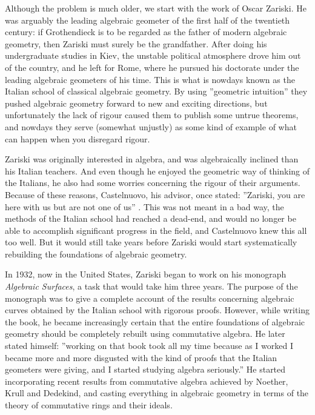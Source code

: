 \documentclass[12pt,a4paper,leqno]{article}
\theoremstyle{plain}
\theoremstyle{definition}
\theoremstyle{remark}
\begin{document}
Although the problem is much older, we start with the work of Oscar Zariski. He was arguably the leading algebraic geometer of the first half of the twentieth century: if Grothendieck is to be regarded as the father of modern algebraic geometry, then Zariski must surely be the grandfather. After doing his undergraduate studies in Kiev, the unstable political atmosphere drove him out of the country, and he left for Rome, where he pursued his doctorate under the leading algebraic geometers of his time. This is what is nowdays known as the Italian school of classical algebraic geometry. By using ''geometric intuition'' they pushed algebraic geometry forward to new and exciting directions, but unfortunately the lack of rigour caused them to publish some untrue theorems, and nowdays they serve (somewhat unjustly) as some kind of example of what can happen when you disregard rigour.

Zariski was originally interested in algebra, and was algebraically inclined than his Italian teachers. And even though he enjoyed the geometric way of thinking of the Italians, he also had some worries concerning the rigour of their arguments. Because of these reasons, Castelnuovo, his advisor, once stated: ''Zariski, you are here with us but are not one of us'' \cite{Par}. This was not meant in a bad way, the methods of the Italian school had reached a dead-end, and would no longer be able to accomplish significant progress in the field, and Castelnuovo knew this all too well. But it would still take years before Zariski would start systematically rebuilding the foundations of algebraic geometry.

In 1932, now in the United States, Zariski began to work on his monograph \emph{Algebraic Surfaces}, a task that would take him three years. The purpose of the monograph was to give a complete account of the results concerning algebraic curves obtained by the Italian school with rigorous proofs. However, while writing the book, he became increasingly certain that the entire foundations of algebraic geometry should be completely rebuilt using commutative algebra. He later stated himself: ''working on that book took all my time because as I worked I became more and more disgusted with the kind of proofs that the Italian geometers were giving, and I started studying algebra seriously.'' \cite{Par} He started incorporating recent results from commutative algebra achieved by Noether, Krull and Dedekind, and casting everything in algebraic geometry in terms of the theory of commutative rings and their ideals. 
\end{document}
